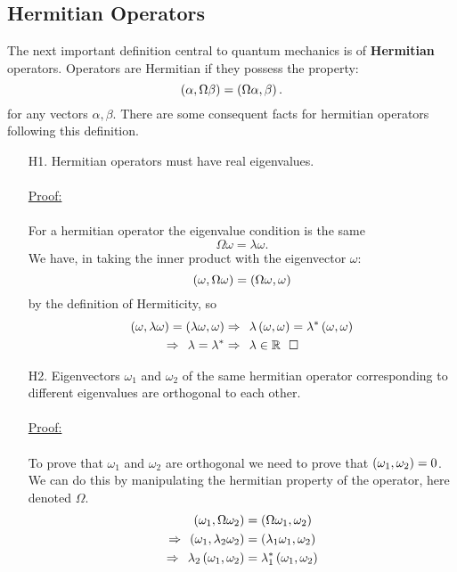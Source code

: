 \subsection{Hermitian Operators}
The next important definition central to quantum mechanics is of \textbf{Hermitian} operators. Operators are Hermitian if they possess the property:
$$
\oip{\alpha}{\Omega\beta}=\oip{\Omega\alpha}{\beta}.
$$
for any vectors $\alpha,\beta$. There are some consequent facts for hermitian operators following this definition.
\begin{enumerate}
    \item[H1.] Hermitian operators must have real eigenvalues. \\\\
    \underline{Proof:}\\\\
    For a hermitian operator the eigenvalue condition is the same
    $$
    \Omega \omega= \lambda \omega.
    $$
    We have, in taking the inner product with the eigenvector $\omega$:
    $$
    \oip{\omega}{\Omega\omega}=\oip{\Omega\omega}{\omega} 
    $$
    by the definition of Hermiticity, so
    $$
    \begin{aligned}
    \oip{\omega}{\lambda\omega}=\oip{\lambda\omega}{\omega} &\Rightarrow\:\: \lambda\oip{\omega}{\omega} = \lambda^{\ast}\oip{\omega}{\omega}\\
    \Rightarrow\:\: \lambda = \lambda^{\ast} &\Rightarrow \:\: \lambda \in \mathbb{R} \btab \square
    \end{aligned}
    $$
    \item[H2.] Eigenvectors $\omega_{1}$ and $\omega_{2}$ of the same hermitian operator corresponding to different eigenvalues are orthogonal to each other.\\\\
    \underline{Proof:}\\\\
    To prove that $\omega_{1}$ and $\omega_{2}$ are orthogonal we need to prove that $\oip{\omega_{1}}{\omega_{2}}=0$. We can do this by manipulating the hermitian property of the operator, here denoted $\Omega$.
    $$
    \begin{aligned}
    \oip{\omega_{1}}{\Omega\omega_{2}}&=\oip{\Omega\omega_{1}}{\omega_{2}}\\
    \Rightarrow\:\: \oip{\omega_{1}}{\lambda_{2}\omega_{2}}&=\oip{\lambda_{1}\omega_{1}}{\omega_{2}}\\
    \Rightarrow\:\: \lambda_{2}\oip{\omega_{1}}{\omega_{2}}&=\lambda_{1}^{\ast}\oip{\omega_{1}}{\omega_{2}}\\

\end{aligned}$$
\end{enumerate}
